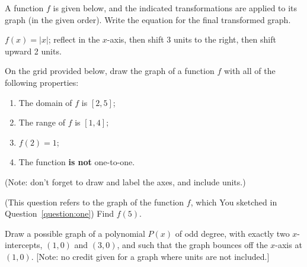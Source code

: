\documentclass[11pt,answers]{exam}
\begin{document}
\begin{questions}
\question[1] A function $f$ is given below, and the indicated transformations are applied to its graph (in the given order). Write the equation for the final transformed graph.
\smallskip

$f(x) = |x|$;
reflect in the $x$-axis, then shift 3 units to the right, then shift upward 2 units.

\fillwithdottedlines{2cm}
\newpage
		
		
\question[2] \label{question:one} On the grid provided below, draw the graph of a function $f$ with all of the following properties:

\begin{minipage}[t][][b]{0.5\textwidth}
	\begin{multicols}{2}
		\begin{enumerate}
			\item The domain of $f$ is $[2,5]$;
			\item The range of $f$ is $[1,4]$;
			\item $f(2)=1$;
			\item The function {\bf{is not}} one-to-one.
		\end{enumerate}
		
		
		
	\end{multicols}
	(Note: don't forget to draw and label the axes, and include units.)
\end{minipage}
\begin{minipage}[t][][b]{0.5\textwidth}
	\begin{center}
		
	\end{center}
\end{minipage}	

\bonusquestion[1] (This question refers to the graph of the function $f$, which You sketched in Question~\ref{question:one}) Find $f(5)$.

\fillwithdottedlines{1cm}
\bonusquestion[2]  Draw a possible graph of a polynomial $P(x)$ of odd degree, with exactly two $x$-intercepts, $(1,0)$ and $(3,0)$, and such that the graph bounces off the $x$-axis at $(1,0)$. [Note: no credit given for a graph where units are not included.]
\smallskip\fillwithgrid{1.8in}



\end{questions}
\end{document}
